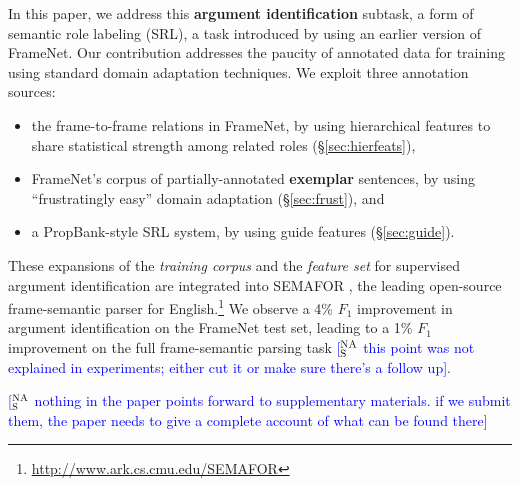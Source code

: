 \documentclass[11pt,a4paper]{article}
\newcommand{\ensuretext}[1]{#1}
\newcommand{\nasmarker}{\ensuretext{\textcolor{blue}{\ensuremath{^{\textsc{NA}}_{\textsc{S}}}}}}
\newcommand{\arkcomment}[3]{\ensuretext{\textcolor{#3}{[#1 #2]}}}
\newcommand{\nascomment}[1]{\arkcomment{\nasmarker}{#1}{blue}}
\begin{document}
In this paper, we address this \textbf{argument identification} 
subtask, a form of semantic role labeling (SRL), 
a task introduced by \citet{gildea-02} using an earlier version of FrameNet.
Our contribution addresses the paucity of annotated data for training 
using  standard domain
adaptation techniques.  We exploit three annotation sources:
\begin{itemize}
  \item the frame-to-frame relations in FrameNet, by using
  hierarchical features to share statistical strength among related roles
  (\S\ref{sec:hierfeats}),
  \item FrameNet's corpus of partially-annotated \textbf{exemplar} sentences,
  by using ``frustratingly easy'' domain adaptation (\S\ref{sec:frust}), and
  \item a PropBank-style SRL system, by using guide features (\S\ref{sec:guide}).
\end{itemize}
These expansions of the \emph{training corpus} and the \emph{feature set}
for supervised argument identification  are integrated into SEMAFOR
\citep{das-14},  the leading open-source frame-semantic parser for English.\footnote{\url{http://www.ark.cs.cmu.edu/SEMAFOR}} 
We observe a 4\% $F_1$ improvement in argument identification on the
FrameNet test set, leading to a 1\% $F_1$ improvement on the full
frame-semantic parsing task \nascomment{this point was not explained
  in experiments; either cut it or make sure there's a follow up}.

\nascomment{nothing in the paper points forward to supplementary
  materials.  if we submit them, the paper needs to give a complete
  account of what can be found there}
\end{document}
